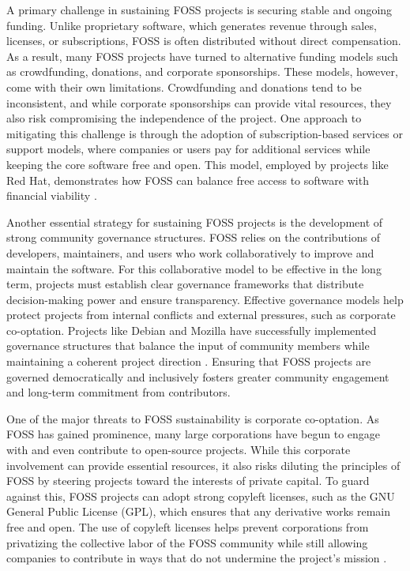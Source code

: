 \begin{refsection}
A primary challenge in sustaining FOSS projects is securing stable and ongoing funding. Unlike proprietary software, which generates revenue through sales, licenses, or subscriptions, FOSS is often distributed without direct compensation. As a result, many FOSS projects have turned to alternative funding models such as crowdfunding, donations, and corporate sponsorships. These models, however, come with their own limitations. Crowdfunding and donations tend to be inconsistent, and while corporate sponsorships can provide vital resources, they also risk compromising the independence of the project. One approach to mitigating this challenge is through the adoption of subscription-based services or support models, where companies or users pay for additional services while keeping the core software free and open. This model, employed by projects like Red Hat, demonstrates how FOSS can balance free access to software with financial viability \cite[pp.~64-66]{weber2005}.

Another essential strategy for sustaining FOSS projects is the development of strong community governance structures. FOSS relies on the contributions of developers, maintainers, and users who work collaboratively to improve and maintain the software. For this collaborative model to be effective in the long term, projects must establish clear governance frameworks that distribute decision-making power and ensure transparency. Effective governance models help protect projects from internal conflicts and external pressures, such as corporate co-optation. Projects like Debian and Mozilla have successfully implemented governance structures that balance the input of community members while maintaining a coherent project direction \cite[pp.~85-87]{raymond2022}. Ensuring that FOSS projects are governed democratically and inclusively fosters greater community engagement and long-term commitment from contributors.

One of the major threats to FOSS sustainability is corporate co-optation. As FOSS has gained prominence, many large corporations have begun to engage with and even contribute to open-source projects. While this corporate involvement can provide essential resources, it also risks diluting the principles of FOSS by steering projects toward the interests of private capital. To guard against this, FOSS projects can adopt strong copyleft licenses, such as the GNU General Public License (GPL), which ensures that any derivative works remain free and open. The use of copyleft licenses helps prevent corporations from privatizing the collective labor of the FOSS community while still allowing companies to contribute in ways that do not undermine the project's mission \cite[pp.~92-94]{stallman2010}.


\end{refsection}

